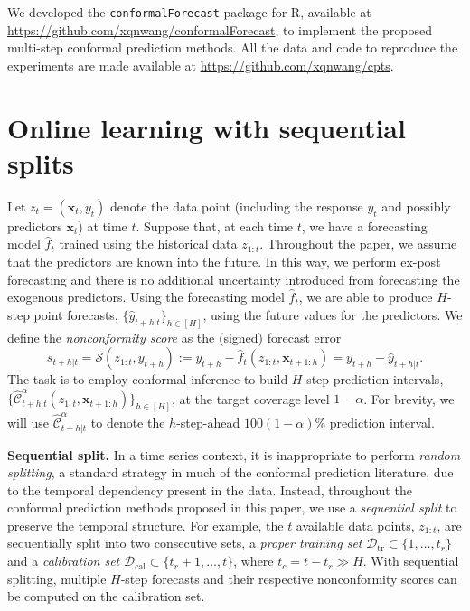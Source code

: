 \documentclass[
  11pt,
  a4paper,
]{article}
\theoremstyle{plain}
\theoremstyle{remark}
\begin{document}
We developed the \texttt{conformalForecast} package for R, available at
\url{https://github.com/xqnwang/conformalForecast}, to implement the
proposed multi-step conformal prediction methods. All the data and code
to reproduce the experiments are made available at
\url{https://github.com/xqnwang/cpts}.

\section{Online learning with sequential splits}\label{sec-setup}

Let \(z_t = (\bm{x}_t, y_t)\) denote the data point (including the
response \(y_t\) and possibly predictors \(\bm{x}_t\)) at time \(t\).
Suppose that, at each time \(t\), we have a forecasting model
\(\hat{f}_t\) trained using the historical data \(z_{1:t}\). Throughout
the paper, we assume that the predictors are known into the future. In
this way, we perform ex-post forecasting and there is no additional
uncertainty introduced from forecasting the exogenous predictors. Using
the forecasting model \(\hat{f}_t\), we are able to produce \(H\)-step
point forecasts, \(\{\hat{y}_{t+h|t}\}_{h\in[H]}\), using the future
values for the predictors. We define the \emph{nonconformity score} as
the (signed) forecast error \[
s_{t+h|t}=\mathcal{S}(z_{1:t}, y_{t+h}):=y_{t+h}-\hat{f}_t(z_{1:t},\bm{x}_{t+1:h})=y_{t+h}-\hat{y}_{t+h|t}.
\] The task is to employ conformal inference to build \(H\)-step
prediction intervals,
\(\{\hat{\mathcal{C}}_{t+h|t}^{\alpha}(z_{1:t},\bm{x}_{t+1:h})\}_{h\in[H]}\),
at the target coverage level \(1-\alpha\). For brevity, we will use
\(\hat{\mathcal{C}}_{t+h|t}^{\alpha}\) to denote the \(h\)-step-ahead
\(100(1-\alpha)\%\) prediction interval.

\textbf{Sequential split.} In a time series context, it is inappropriate
to perform \emph{random splitting}, a standard strategy in much of the
conformal prediction literature, due to the temporal dependency present
in the data. Instead, throughout the conformal prediction methods
proposed in this paper, we use a \emph{sequential split} to preserve the
temporal structure. For example, the \(t\) available data points,
\(z_{1:t}\), are sequentially split into two consecutive sets, a
\emph{proper training set}
\(\mathcal{D}_{\text{tr}} \subset \{1,\ldots,t_r\}\) and a
\emph{calibration set}
\(\mathcal{D}_{\text{cal}} \subset \{t_r+1,\ldots,t\}\), where
\(t_c=t-t_r \gg H\). With sequential splitting, multiple \(H\)-step
forecasts and their respective nonconformity scores can be computed on
the calibration set.
\end{document}
